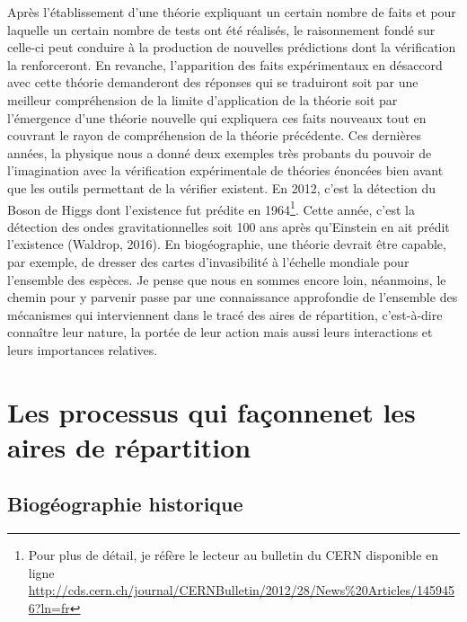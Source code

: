 Après l'établissement d'une théorie expliquant un certain nombre de
faits et pour laquelle un certain nombre de tests ont été réalisés, le
raisonnement fondé sur celle-ci peut conduire à la production de
nouvelles prédictions dont la vérification la renforceront. En revanche,
l'apparition des faits expérimentaux en désaccord avec cette théorie
demanderont des réponses qui se traduiront soit par une meilleur
compréhension de la limite d'application de la théorie soit par
l'émergence d'une théorie nouvelle qui expliquera ces faits nouveaux
tout en couvrant le rayon de compréhension de la théorie précédente. Ces
dernières années, la physique nous a donné deux exemples très probants
du pouvoir de l'imagination avec la vérification expérimentale de
théories énoncées bien avant que les outils permettant de la vérifier
existent. En 2012, c'est la détection du Boson de Higgs dont l'existence
fut prédite en 1964\footnote{Pour plus de détail, je réfère le lecteur
  au bulletin du CERN disponible en ligne
  \url{http://cds.cern.ch/journal/CERNBulletin/2012/28/News\%20Articles/1459456?ln=fr}}.
Cette année, c'est la détection des ondes gravitationnelles soit 100 ans
après qu'Einstein en ait prédit l'existence (Waldrop, 2016). En
biogéographie, une théorie devrait être capable, par exemple, de dresser
des cartes d'invasibilité à l'échelle mondiale pour l'ensemble des
espèces. Je pense que nous en sommes encore loin, néanmoins, le chemin
pour y parvenir passe par une connaissance approfondie de l'ensemble des
mécanismes qui interviennent dans le tracé des aires de répartition,
c'est-à-dire connaître leur nature, la portée de leur action mais aussi
leurs interactions et leurs importances relatives.

\section*{Les processus qui façonnenet les aires de
répartition}\label{les-processus-qui-fauxe7onnenet-les-aires-de-ruxe9partition}

\subsection*{Biogéographie
historique}\label{bioguxe9ographie-historique}

